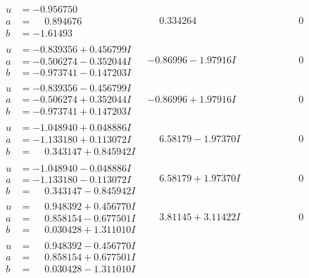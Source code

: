 \documentclass[1p]{elsarticle_modified}
\theoremstyle{definition}
\begin{document}
$$\begin{array}{c|c|c}
\begin{aligned}
u &= -0.956750\phantom{ +0.000000I} \\
a &= \phantom{-}0.894676\phantom{ +0.000000I} \\
b &= -1.61493\phantom{ +0.000000I}\end{aligned}
 & \phantom{-}0.334264\phantom{ +0.000000I} & \phantom{-0.000000 } 0 \\ \hline\begin{aligned}
u &= -0.839356 + 0.456799 I \\
a &= -0.506274 - 0.352044 I \\
b &= -0.973741 - 0.147203 I\end{aligned}
 & -0.86996 - 1.97916 I & \phantom{-0.000000 } 0 \\ \hline\begin{aligned}
u &= -0.839356 - 0.456799 I \\
a &= -0.506274 + 0.352044 I \\
b &= -0.973741 + 0.147203 I\end{aligned}
 & -0.86996 + 1.97916 I & \phantom{-0.000000 } 0 \\ \hline\begin{aligned}
u &= -1.048940 + 0.048886 I \\
a &= -1.133180 + 0.113072 I \\
b &= \phantom{-}0.343147 + 0.845942 I\end{aligned}
 & \phantom{-}6.58179 - 1.97370 I & \phantom{-0.000000 } 0 \\ \hline\begin{aligned}
u &= -1.048940 - 0.048886 I \\
a &= -1.133180 - 0.113072 I \\
b &= \phantom{-}0.343147 - 0.845942 I\end{aligned}
 & \phantom{-}6.58179 + 1.97370 I & \phantom{-0.000000 } 0 \\ \hline\begin{aligned}
u &= \phantom{-}0.948392 + 0.456770 I \\
a &= \phantom{-}0.858154 - 0.677501 I \\
b &= \phantom{-}0.030428 + 1.311010 I\end{aligned}
 & \phantom{-}3.81145 + 3.11422 I & \phantom{-0.000000 } 0 \\ \hline\begin{aligned}
u &= \phantom{-}0.948392 - 0.456770 I \\
a &= \phantom{-}0.858154 + 0.677501 I \\
b &= \phantom{-}0.030428 - 1.311010 I\end{aligned}

\end{array}$$
\end{document}
